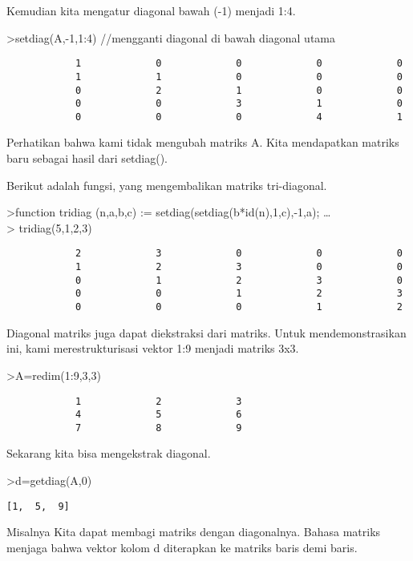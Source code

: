 \documentclass[
]{book}
\begin{document}
Kemudian kita mengatur diagonal bawah (-1) menjadi 1:4.

\textgreater setdiag(A,-1,1:4) //mengganti diagonal di bawah diagonal utama

\begin{verbatim}
            1             0             0             0             0 
            1             1             0             0             0 
            0             2             1             0             0 
            0             0             3             1             0 
            0             0             0             4             1 
\end{verbatim}

Perhatikan bahwa kami tidak mengubah matriks A. Kita mendapatkan matriks baru sebagai hasil dari setdiag().

Berikut adalah fungsi, yang mengembalikan matriks tri-diagonal.

\textgreater function tridiag (n,a,b,c) := setdiag(setdiag(b*id(n),1,c),-1,a); \ldots{}\\
\textgreater{} tridiag(5,1,2,3)

\begin{verbatim}
            2             3             0             0             0 
            1             2             3             0             0 
            0             1             2             3             0 
            0             0             1             2             3 
            0             0             0             1             2 
\end{verbatim}

Diagonal matriks juga dapat diekstraksi dari matriks. Untuk mendemonstrasikan ini, kami merestrukturisasi vektor 1:9 menjadi matriks 3x3.

\textgreater A=redim(1:9,3,3)

\begin{verbatim}
            1             2             3 
            4             5             6 
            7             8             9 
\end{verbatim}

Sekarang kita bisa mengekstrak diagonal.

\textgreater d=getdiag(A,0)

\begin{verbatim}
[1,  5,  9]
\end{verbatim}

Misalnya Kita dapat membagi matriks dengan diagonalnya. Bahasa matriks menjaga bahwa vektor kolom d diterapkan ke matriks baris demi baris.
\end{document}
